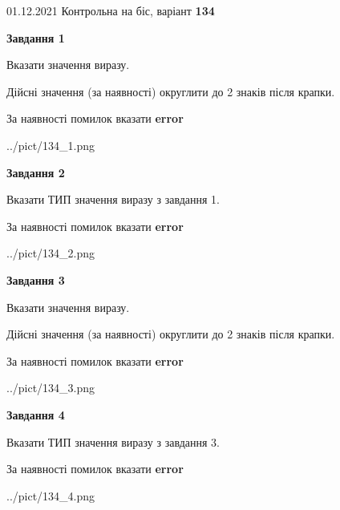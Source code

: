 \documentclass[11pt, ukrainian]{article}
\begin{document}
{01.12.2021 Контрольна на біс, варіант  \No \textbf { 134 }\par}
{
\begin {large}
{\begin {center}\textbf{Завдання 1}\end {center}}\par
Вказати значення виразу. \par
Дійсні значення (за наявності) округлити до 2 знаків після крапки. \par
За наявності помилок вказати \textbf{error}

\begin{center}
	{../pict/134_1.png}
\end{center}
\newpage

{\begin {center}\textbf{Завдання 2}\end {center}}\par
Вказати ТИП значення виразу з завдання 1. \par
За наявності помилок вказати \textbf{error}

\begin{center}
	{../pict/134_2.png}
\end{center}
\newpage

{\begin {center}\textbf{Завдання 3}\end {center}}\par
Вказати значення виразу. \par
Дійсні значення (за наявності) округлити до 2 знаків після крапки. \par
За наявності помилок вказати \textbf{error}

\begin{center}
	{../pict/134_3.png}
\end{center}
\newpage

{\begin {center}\textbf{Завдання 4}\end {center}}\par
Вказати ТИП значення виразу з завдання 3. \par
За наявності помилок вказати \textbf{error}

\begin{center}
	{../pict/134_4.png}
\end{center}
\newpage


\end{large}}
\end{document}
